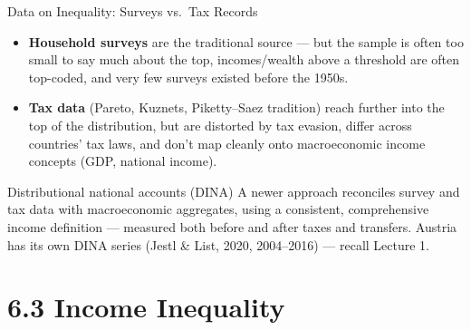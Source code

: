 \documentclass[11pt,aspectratio=169]{beamer}
\begin{document}
\begin{frame}{Data on Inequality: Surveys vs.\ Tax Records}
  \footnotesize
  \begin{itemize}
    \item \textbf{Household surveys} are the traditional source --- but the sample is often too small to say much about the top, incomes/wealth above a threshold are often top-coded, and very few surveys existed before the 1950s.
    \item \textbf{Tax data} (Pareto, Kuznets, Piketty--Saez tradition) reach further into the top of the distribution, but are distorted by tax evasion, differ across countries' tax laws, and don't map cleanly onto macroeconomic income concepts (GDP, national income).
  \end{itemize}
  \vspace{0.3em}
  \begin{alertblock}{Distributional national accounts (DINA)}
    A newer approach reconciles survey and tax data with macroeconomic aggregates, using a consistent, comprehensive income definition --- measured both before and after taxes and transfers. Austria has its own DINA series (Jestl \& List, 2020, 2004--2016) --- recall Lecture 1.
  \end{alertblock}
\end{frame}

\section{6.3 Income Inequality}
\end{document}

